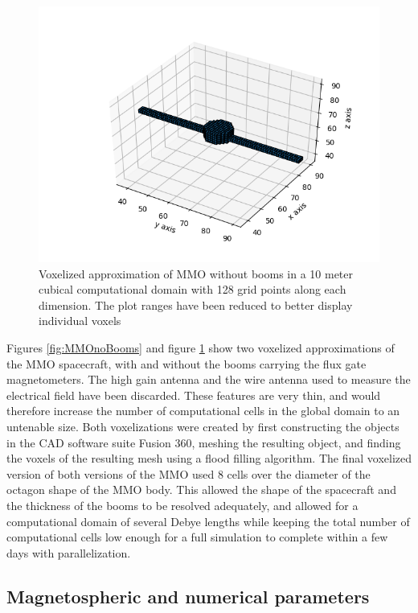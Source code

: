 \begin{figure}[H]
    \centering
    \includegraphics[scale=0.6]{figures/ReferenceFigures/MMO_with_booms.png}
    \caption{Voxelized approximation of MMO without booms in a 10 meter cubical computational domain with 128 grid points along each dimension. The plot ranges have been reduced to better display individual voxels}
    \label{fig:MMOWithBooms}
\end{figure}

\newpage


Figures \ref{fig:MMOnoBooms} and figure \ref{fig:MMOWithBooms} show two voxelized approximations of the MMO spacecraft, with and without the booms carrying the flux gate magnetometers. The high gain antenna and the wire antenna used to measure the electrical field have been discarded. These features are very thin, and would therefore increase the number of computational cells in the global domain to an untenable size. Both voxelizations were created by first constructing the objects in the CAD software suite Fusion 360, meshing the resulting object, and finding the voxels of the resulting mesh using a flood filling algorithm. The final voxelized version of both versions of the MMO used 8 cells over the diameter of the octagon shape of the MMO body. This allowed the shape of the spacecraft and the thickness of the booms to be resolved adequately, and allowed for a computational domain of several Debye lengths while keeping the total number of computational cells low enough for a full simulation to complete within a few days with parallelization.

\subsection{Magnetospheric and numerical parameters}

